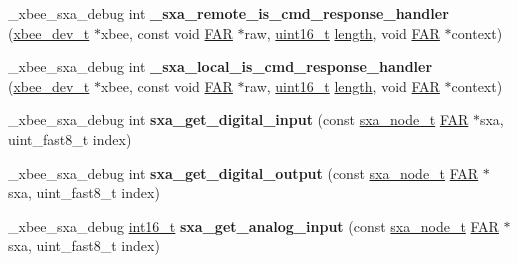 \begin{DoxyCompactItemize}
\item 
\hypertarget{group___s_x_a_gaba26b5a39ec4012c2abf63d16f4ab765}{\-\_\-xbee\-\_\-sxa\-\_\-debug int {\bfseries \-\_\-sxa\-\_\-remote\-\_\-is\-\_\-cmd\-\_\-response\-\_\-handler} (\hyperlink{structxbee__dev__t}{xbee\-\_\-dev\-\_\-t} $\ast$xbee, const void \hyperlink{group__hal_gaef060b3456fdcc093a7210a762d5f2ed}{F\-A\-R} $\ast$raw, \hyperlink{group__hal_ga5a8b2dc9e45a9ee81a94ef304fb62505}{uint16\-\_\-t} \hyperlink{group__zdo_gab2b3adeb2a67e656ff030b56727fd0ac}{length}, void \hyperlink{group__hal_gaef060b3456fdcc093a7210a762d5f2ed}{F\-A\-R} $\ast$context)}\label{group___s_x_a_gaba26b5a39ec4012c2abf63d16f4ab765}

\item 
\hypertarget{group___s_x_a_gaecaa5cfd1a9568899d54920909a01081}{\-\_\-xbee\-\_\-sxa\-\_\-debug int {\bfseries \-\_\-sxa\-\_\-local\-\_\-is\-\_\-cmd\-\_\-response\-\_\-handler} (\hyperlink{structxbee__dev__t}{xbee\-\_\-dev\-\_\-t} $\ast$xbee, const void \hyperlink{group__hal_gaef060b3456fdcc093a7210a762d5f2ed}{F\-A\-R} $\ast$raw, \hyperlink{group__hal_ga5a8b2dc9e45a9ee81a94ef304fb62505}{uint16\-\_\-t} \hyperlink{group__zdo_gab2b3adeb2a67e656ff030b56727fd0ac}{length}, void \hyperlink{group__hal_gaef060b3456fdcc093a7210a762d5f2ed}{F\-A\-R} $\ast$context)}\label{group___s_x_a_gaecaa5cfd1a9568899d54920909a01081}

\item 
\hypertarget{group___s_x_a_gadfbf4b01e49eee344a444f643bd00eab}{\-\_\-xbee\-\_\-sxa\-\_\-debug int {\bfseries sxa\-\_\-get\-\_\-digital\-\_\-input} (const \hyperlink{structsxa__node__t}{sxa\-\_\-node\-\_\-t} \hyperlink{group__hal_gaef060b3456fdcc093a7210a762d5f2ed}{F\-A\-R} $\ast$sxa, uint\-\_\-fast8\-\_\-t index)}\label{group___s_x_a_gadfbf4b01e49eee344a444f643bd00eab}

\item 
\hypertarget{group___s_x_a_ga6a9905fa096110df102ea073aa021914}{\-\_\-xbee\-\_\-sxa\-\_\-debug int {\bfseries sxa\-\_\-get\-\_\-digital\-\_\-output} (const \hyperlink{structsxa__node__t}{sxa\-\_\-node\-\_\-t} \hyperlink{group__hal_gaef060b3456fdcc093a7210a762d5f2ed}{F\-A\-R} $\ast$sxa, uint\-\_\-fast8\-\_\-t index)}\label{group___s_x_a_ga6a9905fa096110df102ea073aa021914}

\item 
\hypertarget{group___s_x_a_ga1687997b92d82244cf50cf8dbc311aa6}{\-\_\-xbee\-\_\-sxa\-\_\-debug \hyperlink{group__hal_ga2140805d08462d474b82ddc8d1c2f3e6}{int16\-\_\-t} {\bfseries sxa\-\_\-get\-\_\-analog\-\_\-input} (const \hyperlink{structsxa__node__t}{sxa\-\_\-node\-\_\-t} \hyperlink{group__hal_gaef060b3456fdcc093a7210a762d5f2ed}{F\-A\-R} $\ast$sxa, uint\-\_\-fast8\-\_\-t index)}\label{group___s_x_a_ga1687997b92d82244cf50cf8dbc311aa6}


\end{DoxyCompactItemize}
